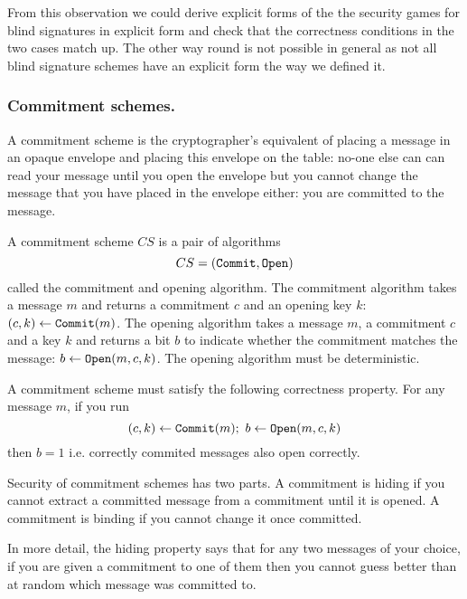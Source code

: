 \documentclass{llncs}
\newcommand{\alg}[1]{\textup{\texttt{#1}}}
\begin{document}
From this observation we could derive explicit forms of the the security games
for blind signatures in explicit form and check that the correctness conditions
in the two cases match up. The other way round is not possible in general as not
all blind signature schemes have an explicit form the way we defined it.

\subsubsection{Commitment schemes.}
A commitment scheme is the cryptographer's equivalent of placing a message in an
opaque envelope and placing this envelope on the table: no-one else can can read
your message until you open the envelope but you cannot change the message that
you have placed in the envelope either: you are committed to the message.

\begin{definition}
A commitment scheme $CS$ is a pair of algorithms
\[
CS = \left( \alg{Commit}, \alg{Open}\right)
\]
called the commitment and opening algorithm. The commitment algorithm takes a
message $m$ and returns a commitment $c$ and an opening key $k$: $(c, k) \gets
\alg{Commit}(m)$. The opening algorithm takes a message $m$, a commitment $c$
and a key $k$ and returns a bit $b$ to indicate whether the commitment matches
the message: $b \gets \alg{Open}(m, c, k)$. The opening algorithm must be
deterministic.

A commitment scheme must satisfy the following correctness property. For any
message $m$, if you run
\[
(c, k) \gets \alg{Commit}(m);\ b \gets \alg{Open}(m, c, k)
\]
then $b = 1$ i.e. correctly commited messages also open correctly.
\end{definition}

Security of commitment schemes has two parts. A commitment is hiding if you
cannot extract a committed message from a commitment until it is opened. A
commitment is binding if you cannot change it once committed.

In more detail, the hiding property says that for any two messages of your
choice, if you are given a commitment to one of them then you cannot guess
better than at random which message was committed to.
\end{document}
